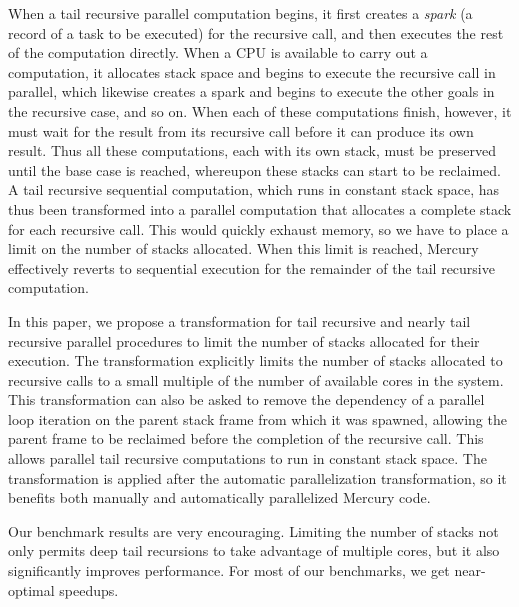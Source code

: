 When a tail recursive parallel computation begins, it
first creates a \emph{spark} (a record of a task to be executed) for
the recursive call,
and then executes the rest of the computation directly.
When a CPU is available to carry out a computation,
it allocates stack space and begins to execute the recursive call in
parallel, which likewise creates a spark and begins to execute the
other goals in the recursive case, and so on.
When each of these computations finish,
however, it must wait for the result from its recursive call
before it can produce its own result.
Thus all these computations, each with its own stack,
must be preserved until the base case is reached,
whereupon these stacks can start to be reclaimed.
A tail recursive sequential computation, which runs in constant stack space,
has thus been transformed into a parallel computation
that allocates a complete stack for each recursive call.
This would quickly exhaust memory,
so we have to place a limit on the number of stacks allocated.
When this limit is reached,
Mercury effectively reverts to sequential execution
for the remainder of the tail recursive computation.


In this paper, we propose a transformation
for tail recursive and nearly tail recursive parallel procedures
to limit the number of stacks allocated for their execution.
The transformation explicitly limits
the number of stacks allocated to recursive calls
to a small multiple of the number of available cores in the system.
This transformation can also be asked
to remove the dependency of a parallel loop iteration
on the parent stack frame from which it was spawned,
allowing the parent frame to be reclaimed
before the completion of the recursive call.
This allows parallel tail recursive computations
to run in constant stack space.
The transformation is applied
after the automatic parallelization transformation,
so it benefits both manually and  automatically parallelized Mercury code.

Our benchmark results are very encouraging.
Limiting the number of stacks
not only permits deep tail recursions to take advantage of multiple cores,
but it also significantly improves performance.
For most of our benchmarks, we get near-optimal speedups.

